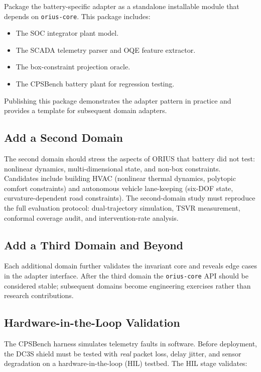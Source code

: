 Package the battery-specific adapter as a standalone installable module
that depends on \texttt{orius-core}.  This package includes:

\begin{itemize}
  \item The SOC integrator plant model.
  \item The SCADA telemetry parser and OQE feature extractor.
  \item The box-constraint projection oracle.
  \item The CPSBench battery plant for regression testing.
\end{itemize}

Publishing this package demonstrates the adapter pattern in practice and
provides a template for subsequent domain adapters.

\subsection{Add a Second Domain}

The second domain should stress the aspects of ORIUS that battery did not
test: nonlinear dynamics, multi-dimensional state, and non-box constraints.
Candidates include building HVAC (nonlinear thermal dynamics, polytopic
comfort constraints) and autonomous vehicle lane-keeping (six-DOF state,
curvature-dependent road constraints).  The second-domain study must
reproduce the full evaluation protocol: dual-trajectory simulation, TSVR
measurement, conformal coverage audit, and intervention-rate analysis.

\subsection{Add a Third Domain and Beyond}

Each additional domain further validates the invariant core and reveals
edge cases in the adapter interface.  After the third domain the
\texttt{orius-core} API should be considered stable; subsequent domains
become engineering exercises rather than research contributions.

\subsection{Hardware-in-the-Loop Validation}

The CPSBench harness simulates telemetry faults in software.  Before
deployment, the DC3S shield must be tested with \emph{real} packet loss,
delay jitter, and sensor degradation on a hardware-in-the-loop (HIL)
testbed.  The HIL stage validates:

